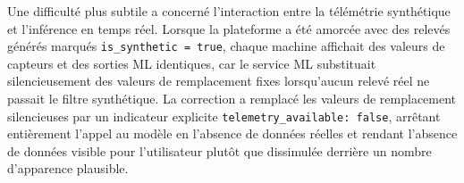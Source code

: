 Une difficulté plus subtile a concerné l'interaction entre la télémétrie synthétique et l'inférence en temps réel. Lorsque la plateforme a été amorcée avec des relevés générés marqués \texttt{is\_synthetic = true}, chaque machine affichait des valeurs de capteurs et des sorties ML identiques, car le service ML substituait silencieusement des valeurs de remplacement fixes lorsqu'aucun relevé réel ne passait le filtre synthétique. La correction a remplacé les valeurs de remplacement silencieuses par un indicateur explicite \texttt{telemetry\_available: false}, arrêtant entièrement l'appel au modèle en l'absence de données réelles et rendant l'absence de données visible pour l'utilisateur plutôt que dissimulée derrière un nombre d'apparence plausible.

